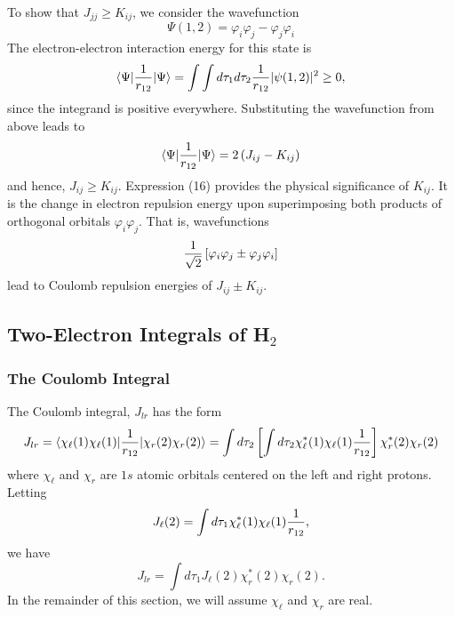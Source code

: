 To show that $J_{jj} \geq K_{ij}$, we consider the wavefunction
\begin{equation}
\Psi ( 1 , 2 ) = \varphi_i \varphi_j - \varphi_j \varphi_i
\end{equation}
The electron-electron interaction energy for this state is
\begin{equation}
\langle \Psi \vert {1 \over r_{12}} \vert \Psi \rangle = \int \int d 
\tau_1 d \tau_2 {1 \over r_{12}} \vert \psi (1,2) \vert^2 \geq 0 ,
\end{equation}
since the integrand is positive everywhere. Substituting the wavefunction 
from above leads to
\begin{equation}
\langle \Psi \vert {1 \over r_{12}} \vert \Psi \rangle = 2 \left( 
J_{ij} - K_{ij} \right)
\label{eqno2app-16}
\end{equation}
and hence, $J_{ij} \geq K_{ij}$.  Expression (16) provides the physical 
significance of $K_{ij}$.  It is the change in electron repulsion energy 
upon superimposing both products of orthogonal orbitals $\varphi_i 
\varphi_j$.  That is, wavefunctions
\begin{equation}
{1 \over \sqrt{2}} \left[ \varphi_i \varphi_j \pm \varphi_j \varphi_i \right]
\end{equation}
lead to Coulomb repulsion energies of $J_{ij} \pm K_{ij}$.

\subsection{Two-Electron Integrals of H$_2$}

\subsubsection{The Coulomb Integral}

The Coulomb integral, $J_{lr}$ has the form
\begin{equation}
J_{lr} = \langle \chi_\ell(1) \chi_\ell(1) \vert {1 \over r_{12}} \vert 
\chi_r(2) \chi_r(2) \rangle = \int d \tau_2 \left[ \int d \tau_2 
\chi^*_\ell (1) \chi_\ell (1) {1 \over r_{12}} \right] \chi^*_r(2) \chi_r(2)
\end{equation}
where $\chi_\ell$ and $\chi_r$ are $1s$ atomic orbitals centered on the 
left and right protons.  Letting
\begin{equation}
J_\ell(2) = \int d \tau_1 \chi^*_\ell (1) \chi_\ell (1) {1 \over r_{12}} ,
\end{equation}
we have
\begin{equation}
J_{lr} = \int d \tau_1 J_\ell (2) \chi^*_r (2) \chi_r (2) .
\label{eqno2app-17}
\end{equation}
In the remainder of this section, we will assume $\chi_\ell$ and
$\chi_r$ are real.
    
